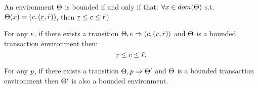 \documentclass[a4paper,11pt]{article}
\begin{document}
\clearpage
{}
\begin{defn}
An environment $\Theta$ is bounded if and only if that:
$\forall x \in dom(\Theta)$ s.t. $\trsenv(x) =(\fval, (\ubar{\rval}, \bar{\rval}))$,
 then 
$\ubar{\rval} \leq \fval \leq \bar{\rval}$) 
\end{defn}
%
%
\begin{thm}
\label{thm:expsound}
For any $e$, if there exists a transition 
$\trsenv, \expr \trsto (\fval, (\ubar{\rval}, \bar{\rval}))$ 
and $\Theta$ is a bounded transaction environment
%
then:
%
$$\ubar{\rval} \leq \fval \leq \bar{\rval}.$$
%
\end{thm}
%
%
%
\begin{thm}
\label{thm:progsound}
For any $p$, if there exists a transition 
$\Theta, p \Rightarrow \Theta'$ and $\Theta$ is a bounded transaction environment 
then 
$\Theta'$ is also a bounded environment.
\end{thm}
%
\end{document}
